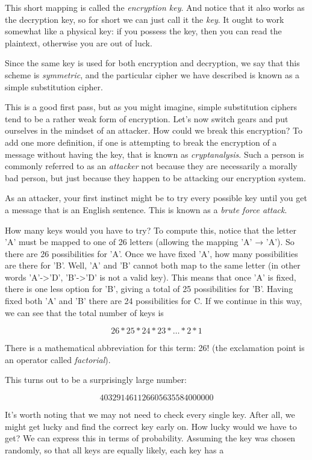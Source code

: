 \documentclass[UTF8]{book}
\begin{document}
\begin{CJK}{UTF8}{gbsn}
This short mapping is called the \emph{encryption key}. And notice that it also works as the decryption key, so for short we can just call it the \emph{key}. It ought to work somewhat like a physical key: if you possess the key, then you can read the plaintext, otherwise you are out of luck.

Since the same key is used for both encryption and decryption, we say that this scheme is \emph{symmetric}, and the particular cipher we have described is known as a simple substitution cipher.

This is a good first pass, but as you might imagine, simple substitution ciphers tend to be a rather weak form of encryption. Let's now switch gears and put ourselves in the mindset of an attacker. How could we break this encryption? To add one more definition, if one is attempting to break the encryption of a message without having the key, that is known as \emph{cryptanalysis}. Such a person is commonly referred to as an \emph{attacker} not because they are necessarily a morally bad person, but just because they happen to be attacking our encryption system.

As an attacker, your first instinct might be to try every possible key until you get a message that is an English sentence. This is known as a \emph{brute force attack}.

How many keys would you have to try? To compute this, notice that the letter 'A' must be mapped to one of 26 letters (allowing the mapping 'A' → 'A'). So there are 26 possibilities for 'A'. Once we have fixed 'A', how many possibilities are there for 'B'. Well, 'A' and 'B' cannot both map to the same letter (in other words 'A'->'D', 'B'->'D' is not a valid key). This means that once 'A' is fixed, there is one less option for 'B', giving a total of 25 possibilities for 'B'. Having fixed both 'A' and 'B' there are 24 possibilities for C. If we continue in this way, we can see that the total number of keys is

\[ 26*25*24*23* … * 2 * 1 \]

There is a mathematical abbreviation for this term: 26! (the exclamation point is an operator called \emph{factorial}).

This turns out to be a surprisingly large number:

\[ 403291461126605635584000000 \]

It's worth noting that we may not need to check every single key. After all, we might get lucky and find the correct key early on. How lucky would we have to get? We can express this in terms of probability. Assuming the key was chosen randomly, so that all keys are equally likely, each key has a


\end{CJK}
\end{document}
